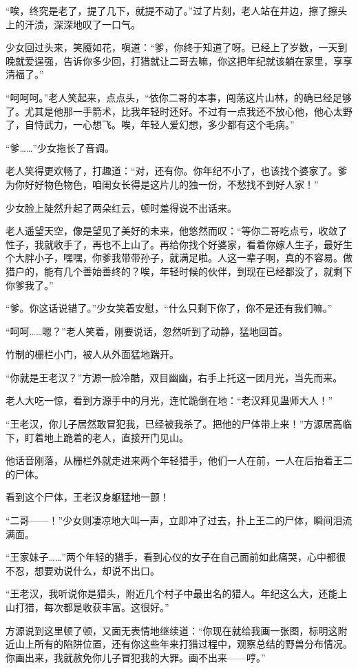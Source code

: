 \begin{this_body}
“唉，终究是老了，提了几下，就提不动了。”过了片刻，老人站在井边，擦了擦头上的汗渍，深深地叹了一口气。

少女回过头来，笑魇如花，嗔道：“爹，你终于知道了呀。已经上了岁数，一天到晚就爱逞强，告诉你多少回，打猎就让二哥去嘛，你这把年纪就该躺在家里，享享清福了。”

“呵呵呵。”老人笑起来，点点头，“依你二哥的本事，闯荡这片山林，的确已经足够了。尤其是他那一手箭术，比我年轻时还好。不过有一点我还不放心他，他心太野了，自恃武力，一心想飞。唉，年轻人爱幻想，多少都有这个毛病。”

“爹……”少女拖长了音调。

老人笑得更欢畅了，打趣道：“对，还有你。你年纪不小了，也该找个婆家了。爹为你好好物色物色，咱闺女长得是这片儿的独一份，不愁找不到好人家！”

少女脸上陡然升起了两朵红云，顿时羞得说不出话来。

老人遥望天空，像是望见了美好的未来，他悠然而叹：“等你二哥吃点亏，收敛了性子，我就收手了，再也不上山了。再给你找个好婆家，看着你嫁人生子，最好生个大胖小子，嘿嘿，你爹我带带孙子，就满足啦。人这一辈子啊，真的不容易。做猎户的，能有几个善始善终的？唉，年轻时候的伙伴，到现在已经都没了，就剩下你爹我了。”

“爹。你这话说错了。”少女笑着安慰，“什么只剩下你了，你不是还有我们嘛。”

“呵呵……嗯？”老人笑着，刚要说话，忽然听到了动静，猛地回首。

竹制的栅栏小门，被人从外面猛地踹开。

“你就是王老汉？”方源一脸冷酷，双目幽幽，右手上托这一团月光，当先而来。

老人大吃一惊，看到方源手中的月光，连忙跪倒在地：“老汉拜见蛊师大人！”

“王老汉，你儿子居然敢冒犯我，已经被我杀了。把他的尸体带上来！”方源居高临下，盯着地上跪着的老人，直接开门见山。

他话音刚落，从栅栏外就走进来两个年轻猎手，他们一人在前，一人在后抬着王二的尸体。

看到这个尸体，王老汉身躯猛地一颤！

“二哥——！”少女则凄凉地大叫一声，立即冲了过去，扑上王二的尸体，瞬间泪流满面。

“王家妹子……”两个年轻的猎手，看到心仪的女子在自己面前如此痛哭，心中都很不忍，想要劝说什么，却说不出口。

“王老汉，我听说你是猎头，附近几个村子中最出名的猎人。年纪这么大，还能上山打猎，每次都是收获丰富。这很好。”

方源说到这里顿了顿，又面无表情地继续道：“你现在就给我画一张图，标明这附近山上所有的陷阱位置，还有你这些年来打猎过程中，观察总结的野兽分布情况。你画出来，我就赦免你儿子冒犯我的大罪。画不出来——哼。”


\end{this_body}
